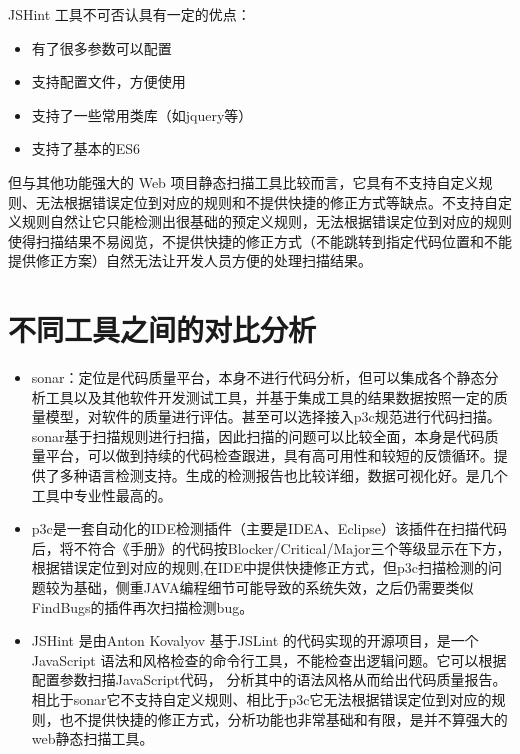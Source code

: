 \documentclass[hyperref, a4paper]{ctexart}
\providecommand{\tightlist}{%
  \setlength{\itemsep}{0pt}\setlength{\parskip}{0pt}}
\begin{document}
JSHint 工具不可否认具有一定的优点：

\begin{itemize}
\tightlist
\item
  有了很多参数可以配置
\item
  支持配置文件，方便使用
\item
  支持了一些常用类库（如jquery等）
\item
  支持了基本的ES6
\end{itemize}

但与其他功能强大的 Web
项目静态扫描工具比较而言，它具有不支持自定义规则、无法根据错误定位到对应的规则和不提供快捷的修正方式等缺点。不支持自定义规则自然让它只能检测出很基础的预定义规则，无法根据错误定位到对应的规则使得扫描结果不易阅览，不提供快捷的修正方式（不能跳转到指定代码位置和不能提供修正方案）自然无法让开发人员方便的处理扫描结果。

\hypertarget{ux4e0dux540cux5de5ux5177ux4e4bux95f4ux7684ux5bf9ux6bd4ux5206ux6790}{%
\section{不同工具之间的对比分析}\label{ux4e0dux540cux5de5ux5177ux4e4bux95f4ux7684ux5bf9ux6bd4ux5206ux6790}}

\begin{itemize}
\item
  sonar：定位是代码质量平台，本身不进行代码分析，但可以集成各个静态分析工具以及其他软件开发测试工具，并基于集成工具的结果数据按照一定的质量模型，对软件的质量进行评估。甚至可以选择接入p3c规范进行代码扫描。sonar基于扫描规则进行扫描，因此扫描的问题可以比较全面，本身是代码质量平台，可以做到持续的代码检查跟进，具有高可用性和较短的反馈循环。提供了多种语言检测支持。生成的检测报告也比较详细，数据可视化好。是几个工具中专业性最高的。
\item
  p3c是一套自动化的IDE检测插件（主要是IDEA、Eclipse）该插件在扫描代码后，将不符合《手册》的代码按Blocker/Critical/Major三个等级显示在下方，根据错误定位到对应的规则,在IDE中提供快捷修正方式，但p3c扫描检测的问题较为基础，侧重JAVA编程细节可能导致的系统失效，之后仍需要类似FindBugs的插件再次扫描检测bug。
\item
  JSHint 是由Anton Kovalyov 基于JSLint
  的代码实现的开源项目，是一个JavaScript
  语法和风格检查的命令行工具，不能检查出逻辑问题。它可以根据配置参数扫描JavaScript代码，
  分析其中的语法风格从而给出代码质量报告。相比于sonar它不支持自定义规则、相比于p3c它无法根据错误定位到对应的规则，也不提供快捷的修正方式，分析功能也非常基础和有限，是并不算强大的web静态扫描工具。
\end{itemize}
\end{document}
